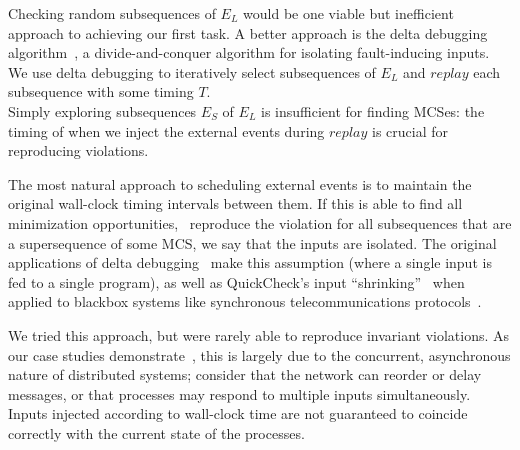  Checking
random subsequences of $E_L$ would be one viable but inefficient
approach to achieving our first task. A better approach is
the delta debugging algorithm~\cite{Zeller:1999:YMP:318773.318946,Zeller:2002:SIF:506201.506206}, a
divide-and-conquer algorithm for
isolating fault-inducing inputs. We use delta
debugging to iteratively select subsequences of $E_L$ and $replay$ each
subsequence with some timing $T$.\\[0.5ex]
%
 Simply
exploring subsequences $E_S$ of $E_L$ is insufficient for finding
MCSes: the timing of when we inject the external events during $replay$ is crucial for
reproducing violations.

The most natural approach to scheduling
external events is to maintain the original wall-clock timing intervals
between them.
If this is able to find all minimization opportunities,
\ie~reproduce the violation for all
subsequences that are a supersequence of some MCS, we say that the inputs are
isolated. The original applications of delta
debugging~\cite{Zeller:1999:YMP:318773.318946,Zeller:2002:SIF:506201.506206,regehr2012test,burger2011minimizing} make this assumption (where a
single input is fed to a single program), as well as QuickCheck's input ``shrinking''~\cite{claessen2000quickcheck}
when applied to blackbox systems like synchronous
telecommunications protocols~\cite{arts2006testing}.

We tried this approach, but were rarely
able to reproduce invariant violations. As our case studies
demonstrate~\cite{sts2014}, this is largely due
to the concurrent, asynchronous nature of distributed systems; consider that the network
can reorder or delay messages, or that processes may
respond to multiple inputs simultaneously.
Inputs injected according to wall-clock time are not guaranteed to
coincide correctly with the current state of the processes.

